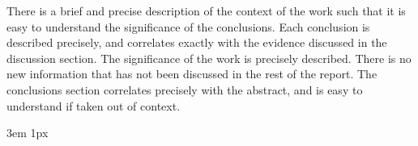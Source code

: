 \documentclass{Academic}
\begin{document}
There is a brief and precise description of the context of the work such that it is easy to understand the significance of the conclusions.  
Each conclusion is described precisely, and correlates exactly with the evidence discussed in the discussion section.
The significance of the work is precisely described.
There is no new information that has not been discussed in the rest of the report.
The conclusions section correlates precisely with the abstract, and is easy to understand if taken out of context.


\singlespacing
\emergencystretch 3em
\hfuzz 1px
\printbibliography[heading=bibnumbered]




\end{document}
